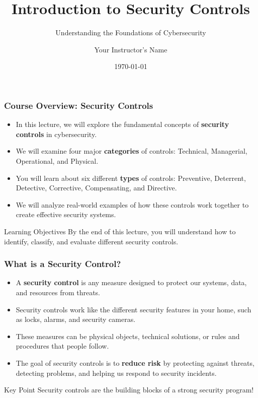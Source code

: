 \documentclass{beamer}
\title{Introduction to Security Controls}
\subtitle{Understanding the Foundations of Cybersecurity}
\author{Your Instructor's Name}
\institute{High School Cybersecurity Course}
\date{\today}
\begin{document}
\begin{frame}
    \titlepage
\end{frame}

\begin{frame}
    \frametitle{Course Overview: Security Controls}
    
    \begin{itemize}
        \item In this lecture, we will explore the fundamental concepts of \textbf{security controls} in cybersecurity.
        
        \item We will examine four major \textbf{categories} of controls: Technical, Managerial, Operational, and Physical.
        
        \item You will learn about six different \textbf{types} of controls: Preventive, Deterrent, Detective, Corrective, Compensating, and Directive.
        
        \item We will analyze real-world examples of how these controls work together to create effective security systems.
    \end{itemize}
    
    \begin{block}{Learning Objectives}
        By the end of this lecture, you will understand how to identify, classify, and evaluate different security controls.
    \end{block}
\end{frame}

\begin{frame}
    \frametitle{What is a Security Control?}
    
    \begin{itemize}
        \item A \textbf{security control} is any measure designed to protect our systems, data, and resources from threats.
        
        \item Security controls work like the different security features in your home, such as locks, alarms, and security cameras.
        
        \item These measures can be physical objects, technical solutions, or rules and procedures that people follow.
        
        \item The goal of security controls is to \textbf{reduce risk} by protecting against threats, detecting problems, and helping us respond to security incidents.
    \end{itemize}
    
    \begin{alertblock}{Key Point}
        Security controls are the building blocks of a strong security program!
    \end{alertblock}
\end{frame}
\end{document}
